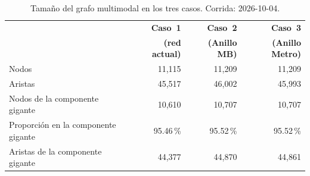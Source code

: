\begin{table}[H]
    \centering
    \caption[Tamaño del grafo en los tres casos]{%
    Tamaño del grafo multimodal en los tres casos. Corrida: 2026-10-04.}
    \label{tab:anillo-grafo}
    \small
    \begin{tabular}{|l|r|r|r|}
        \hline
        & \textbf{Caso~1} & \textbf{Caso~2} & \textbf{Caso~3} \\
        & \textbf{(red actual)} & \textbf{(Anillo MB)} &
          \textbf{(Anillo Metro)} \\
        \hline
        Nodos                         & 11,115 & 11,209 & 11,209 \\
        Aristas                       & 45,517 & 46,002 & 45,993 \\
        Nodos de la componente gigante & 10,610 & 10,707 & 10,707 \\
        Proporción en la componente gigante & 95.46\,\% & 95.52\,\% &
            95.52\,\% \\
        Aristas de la componente gigante & 44,377 & 44,870 & 44,861 \\
        \hline
    \end{tabular}
\end{table}
